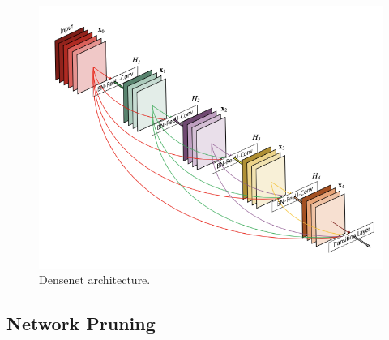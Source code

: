 \documentclass{article}
\begin{document}
    \begin{figure}[H]
      \centering 
      \includegraphics[scale=0.4]{img/02_Control/densenet.png}
      \caption{Densenet architecture. } 
      \label{fig:densenet_architecture}
    \end{figure}

  \subsection{Network Pruning}
\end{document}
